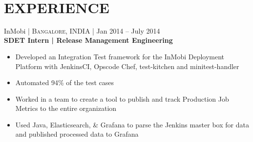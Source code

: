 \documentclass[10pt]{article} %
\begin{document}
\color{text1} %


\par{\\ %
	

\begin{minipage}[t]{0.57\textwidth} %
\vspace{0pt} %
	

\section{\uppercase{\textbf{Experience}}}



{\raggedright\large InMobi \normalsize\textsc{ | Bangalore, INDIA} | Jan 2014 -- July 2014\\
\textbf{SDET Intern | Release Management Engineering}\\[5pt]}
\vspace{0pt}
\begin{itemize}\itemsep-0.25em \item Developed an Integration Test framework for the InMobi Deployment Platform with JenkinsCI, Opscode Chef, test-kitchen and minitest-handler \item Automated 94\% of the test cases \item Worked in a team to create a tool to publish and track Production Job Metrics to the entire organization \item Used Java, Elasticsearch, \& Grafana to parse the Jenkins master box for data and published processed data to Grafana
\end{itemize}\\


\end{minipage}}
\end{document}
